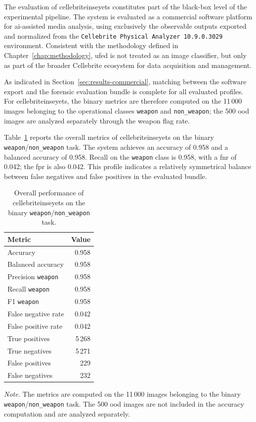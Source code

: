 The evaluation of \gls{cellebriteinseyets} constitutes part of the black-box
level of the experimental pipeline. The system is evaluated as a commercial
software platform for \gls{ai}-assisted media analysis, using exclusively the
observable outputs exported and normalized from the
\texttt{Cellebrite Physical Analyzer 10.9.0.3029} environment. Consistent with
the methodology defined in Chapter~\ref{chap:methodology}, \gls{ufed} is not
treated as an image classifier, but only as part of the broader Cellebrite
ecosystem for data acquisition and management.

As indicated in Section~\ref{sec:results-commercial}, matching between the
software export and the forensic evaluation bundle is complete for all
evaluated profiles. For \gls{cellebriteinseyets}, the binary metrics are
therefore computed on the 11\,000 images belonging to the operational classes
\texttt{weapon} and \texttt{non\_weapon}; the 500 \gls{ood} images are analyzed
separately through the weapon flag rate.

Table~\ref{tab:results-cellebrite-global-metrics} reports the overall metrics
of \gls{cellebriteinseyets} on the binary
\texttt{weapon}/\texttt{non\_weapon} task. The system achieves an accuracy of
0.958 and a balanced accuracy of 0.958. Recall on the \texttt{weapon} class is
0.958, with a \gls{fnr} of 0.042; the \gls{fpr} is also 0.042. This profile
indicates a relatively symmetrical balance between false negatives and false
positives in the evaluated bundle.

\begin{table}[H]
\centering
\caption{Overall performance of \gls{cellebriteinseyets} on the binary \texttt{weapon}/\texttt{non\_weapon} task.}
\label{tab:results-cellebrite-global-metrics}
\small
\begin{tabular}{lr}
\toprule
\textbf{Metric} & \textbf{Value} \\
\midrule
Accuracy & 0.958 \\
Balanced accuracy & 0.958 \\
Precision \texttt{weapon} & 0.958 \\
Recall \texttt{weapon} & 0.958 \\
F1 \texttt{weapon} & 0.958 \\
False negative rate & 0.042 \\
False positive rate & 0.042 \\
True positives & 5\,268 \\
True negatives & 5\,271 \\
False positives & 229 \\
False negatives & 232 \\
\bottomrule
\end{tabular}

\vspace{0.4em}
\footnotesize
\textit{Note.} The metrics are computed on the 11\,000 images belonging to the
binary \texttt{weapon}/\texttt{non\_weapon} task. The 500 \gls{ood} images are
not included in the accuracy computation and are analyzed separately.
\end{table}

